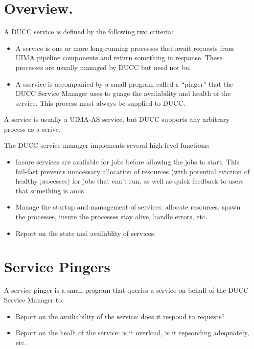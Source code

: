 
      \section{Overview.} 
      A DUCC service is defined by the following two criteria:
      \begin{itemize}
          \item A service is one or more long-running processes that await requests from
            UIMA pipeline components and return something in response.  These processes
            are usually managed by DUCC but need not be.
          \item A sservice is accompanied by a small program called a ``pinger'' that
            the DUCC Service Manager uses to guage the availability and health of the
            service.  This process must always be supplied to DUCC.
      \end{itemize}

      A service is usually a UIMA-AS service, but DUCC supports any arbitrary process
      as a serive.

      The DUCC service manager implements several high-level functions:
      
      \begin{itemize}
          \item Insure services are available for jobs before allowing the jobs to start. This fail-fast
            prevents unncessary allocation of resources (with potential eviction of healthy processes)
            for jobs that can't run, as well as quick feedback to users that something is amis.
      
          \item Manage the startup and management of services: allocate resources, spawn the
            processes, insure the processes stay alive, handle errors, etc.
      
          \item Report on the state and availablity of services.
       \end{itemize}

      \section{Service Pingers}
      A service pinger is a small program that queries a service on behalf of the
      DUCC Service Manager to:
      \begin{itemize}
        \item Report on the availiability of the service: does it respond to requests?
        \item Report on the healh of the service: is it overload, is it repsonding
          adequiately, etc.
      \end{itemize}
      
